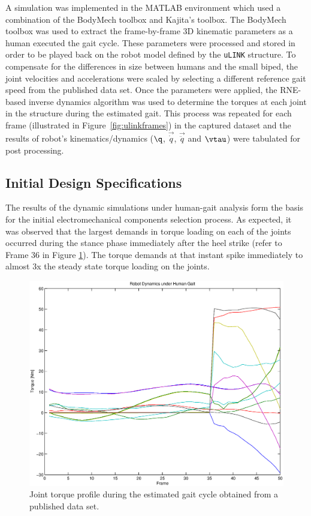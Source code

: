 A simulation was implemented in the MATLAB environment which used a combination of the BodyMech toolbox and Kajita's toolbox. The BodyMech toolbox was used to extract the frame-by-frame 3D kinematic parameters as a human executed the gait cycle. These parameters were processed and stored in order to be played back on the robot model defined by the \texttt{uLINK} structure. To compensate for the differences in size between humans and the small biped, the joint velocities and accelerations were scaled by selecting a different reference gait speed from the published data set. Once the parameters were applied, the RNE-based inverse dynamics algorithm was used to determine the torques at each joint in the structure during the estimated gait. This process was repeated for each frame (illustrated in Figure~\ref{fig:ulinkframes}) in the captured dataset and the results of robot's kinematics/dynamics ($\q$, $\vec{\dot{q}}$, $\vec{\ddot{q}}$ and $\vtau$) were tabulated for post processing. 


\subsection{Initial Design Specifications} %
\label{sec:initial_design_requirements}
The results of the dynamic simulations under human-gait analysis form the basis for the initial electromechanical components selection process. As expected, it was observed that the largest demands in torque loading on each of the joints occurred during the stance phase immediately after the heel strike (refer to Frame 36 in Figure \ref{fig:gaitplot}). The torque demands at that instant spike immediately to almost 3x the steady state torque loading on the joints. 

\begin{figure}[!h]
	\begin{center}
    \includegraphics[scale=0.6]{fig/design/gaitplot.eps}
	\end{center}
  \caption{Joint torque profile during the estimated gait cycle obtained from a published data set.}
  	\label{fig:gaitplot}
\end{figure}

